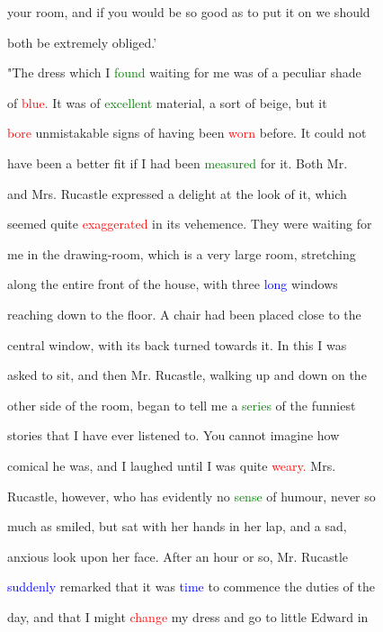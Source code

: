  your room, and if you would be so \textcolor{BurntOrange}{good} as to put it on we should

 both be extremely \textcolor{BurntOrange}{obliged.'}



 "The dress which I \textcolor{green}{found} \textcolor{BurntOrange}{waiting} for me was of a peculiar shade

 of \textcolor{red}{blue.} It was of \textcolor{green}{excellent} material, a sort of beige, but it

 \textcolor{red}{bore} unmistakable signs of having been \textcolor{red}{worn} before. It could not

 have been a better fit if I had been \textcolor{green}{measured} for it. Both Mr.

 and Mrs. Rucastle expressed a \textcolor{BurntOrange}{delight} at the look of it, which

 seemed quite \textcolor{red}{exaggerated} in its vehemence. They were \textcolor{BurntOrange}{waiting} for

 me in the drawing-room, which is a very large room, stretching

 along the entire front of the house, with three \textcolor{blue}{long} windows

 reaching down to the floor. A chair had been placed close to the

 central window, with its back turned towards it. In this I was

 asked to sit, and then Mr. Rucastle, walking up and down on the

 other side of the room, began to tell me a \textcolor{green}{series} of the funniest

 stories that I have ever listened to. You cannot imagine how

 comical he was, and I \textcolor{BurntOrange}{laughed} until I was quite \textcolor{red}{weary.} Mrs.

 Rucastle, however, who has evidently no \textcolor{green}{sense} of humour, never so

 much as \textcolor{BurntOrange}{smiled,} but sat with her hands in her lap, and a sad,

 \textcolor{BurntOrange}{anxious} look upon her face. After an hour or so, Mr. Rucastle

 \textcolor{blue}{suddenly} remarked that it was \textcolor{blue}{time} to commence the duties of the

 day, and that I might \textcolor{red}{change} my dress and go to little Edward in

